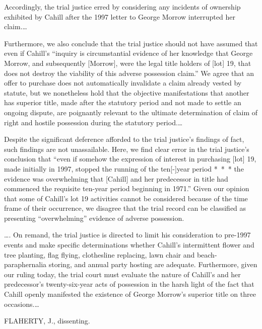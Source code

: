 Accordingly, the trial justice erred by considering any incidents of ownership
exhibited by Cahill after the 1997 letter to George Morrow interrupted her
claim.\ldots


Furthermore, we also conclude that the trial justice should not have assumed
that even if Cahill's ``inquiry is circumstantial evidence of her knowledge
that George Morrow, and subsequently [Morrow], were the legal title holders of
[lot] 19, that does not destroy the viability of this adverse possession
claim.'' We agree that an offer to purchase does not automatically invalidate a
claim already vested by statute, but we nonetheless hold that the objective
manifestations that another has superior title, made after the statutory period
and not made to settle an ongoing dispute, are poignantly relevant to the
ultimate determination of claim of right and hostile possession during the
statutory period.\ldots


Despite the significant deference afforded to the trial justice's findings of
fact, such findings are not unassailable. Here, we find clear error in the
trial justice's conclusion that ``even if somehow the expression of interest in
purchasing [lot] 19, made initially in 1997, stopped the running of the
ten[-]year period *~*~* the evidence was overwhelming that [Cahill] and her
predecessor in title had commenced the requisite ten-year period beginning in
1971.'' Given our opinion that some of Cahill's lot 19 activities cannot be
considered because of the time frame of their occurrence, we disagree that the
trial record can be classified as presenting ``overwhelming'' evidence of
adverse possession.

\ldots. On remand, the trial justice is directed to limit his consideration to
pre-1997 events and make specific determinations whether Cahill's intermittent
flower and tree planting, flag flying, clothesline replacing, lawn chair and
beach-paraphernalia storing, and annual party hosting are adequate.
Furthermore, given our ruling today, the trial court must evaluate the nature
of Cahill's and her predecessor's twenty-six-year acts of possession in the
harsh light of the fact that Cahill openly manifested the existence of George
Morrow's superior title on three occasions.\ldots

FLAHERTY, J., dissenting. 

